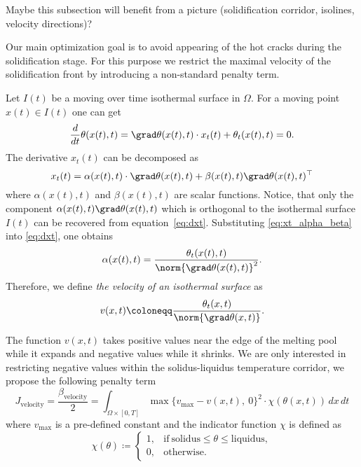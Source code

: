 {\color{TolHighContrastBlue}
Maybe this subsection will benefit from a picture (solidification corridor, isolines, velocity directions)?
}

Our main optimization goal is to avoid appearing of the hot cracks during the solidification stage. For this purpose we restrict the maximal velocity of the solidification front by introducing a non-standard penalty term.

Let $I(t)$ be a moving over time isothermal surface in $\Omega$. For a moving point $x(t) \in I(t)$ one can get
\begin{equation} \label{eq:dxt}
	\frac{d}{dt} \theta(x(t),t) = \grad \theta(x(t),t) \cdot x_t(t) + \theta_t(x(t),t) = 0.
\end{equation}
The derivative $x_t(t)$ can be decomposed as
\begin{equation} \label{eq:xt_alpha_beta}
	x_t(t) = \alpha(x(t),t) \cdot \grad \theta(x(t),t) + \beta(x(t),t) \grad \theta(x(t),t)^{\top}
\end{equation}
where $\alpha(x(t),t)$ and $\beta(x(t),t)$ are scalar functions. Notice, that only the component $\alpha(x(t),t) \grad \theta(x(t),t)$ which is orthogonal to the isothermal surface $I(t)$ can be recovered from equation~\eqref{eq:dxt}. Substituting \eqref{eq:xt_alpha_beta} into \eqref{eq:dxt}, one obtains
\begin{equation}
	\alpha(x(t),t) = \frac{\theta_t(x(t),t)}{\norm{\grad \theta(x(t),t)}^2}.
\end{equation}
Therefore, we define \emph{the velocity of an isothermal surface} as
\begin{equation}
	v(x,t) \coloneqq \frac{\theta_t(x,t)}{\norm{\grad \theta(x,t)}}.
\end{equation}

The function $v(x,t)$ takes positive values near the edge of the melting pool while it expands and negative values while it shrinks. We are only interested in restricting negative values within the solidus-liquidus temperature corridor, we propose the following penalty term
\begin{equation}
	J_{\text{velocity}} = \frac{\beta_\text{velocity}}{2} =
	\int_{\Omega \times [0,T]} \max \{ v_{\max} - v(x,t),\ 0 \}^2 \cdot \chi(\theta(x,t))\, dx\,dt
\end{equation}
where $v_{\max}$ is a pre-defined constant and the indicator function $\chi$ is defined as
\begin{equation}
	\chi(\theta) \coloneqq \left\{
		\begin{array}{ll}
			1, & \text{if}\ \text{solidus} \le \theta \le \text{liquidus}, \\
			0, & \text{otherwise}.
		\end{array} \right.
\end{equation}


